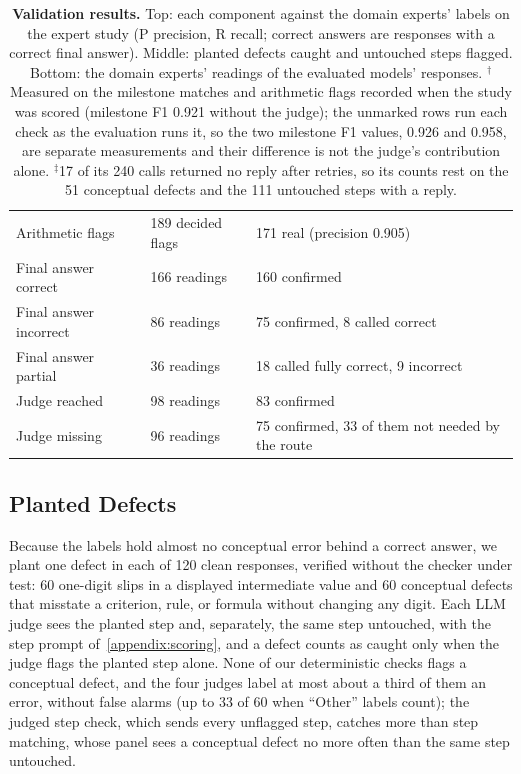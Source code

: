\begin{table}[t]
\begin{tabular}{l|l|l}
        Arithmetic flags & 189 decided flags & 171 real (precision 0.905) \\
        Final answer correct & 166 readings & 160 confirmed \\
        Final answer incorrect & 86 readings & 75 confirmed, 8 called correct \\
        Final answer partial & 36 readings & 18 called fully correct, 9 incorrect \\
        Judge reached & 98 readings & 83 confirmed \\
        Judge missing & 96 readings & 75 confirmed, 33 of them not needed by the route \\
        \bottomrule
    \end{tabular}
    \caption{\textbf{Validation results.} Top: each component against the domain experts' labels on
    the expert study (P precision, R recall; correct answers are responses with a correct final
    answer).
    Middle: planted defects caught and untouched steps flagged.
    Bottom: the domain experts' readings of the evaluated models' responses.
    $^\dagger$Measured on the milestone matches and arithmetic flags recorded when the study was
    scored (milestone F1 0.921 without the judge); the unmarked rows run each check as the
    evaluation runs it, so the two milestone F1 values, 0.926 and 0.958, are separate measurements
    and their difference is not the judge's contribution alone.
    $^\ddagger$17 of its 240 calls returned no reply after retries, so its counts rest on the 51
    conceptual defects and the 111 untouched steps with a reply.}
    \label{tab:validation_results}
\end{table}

\subsection{Planted Defects}

Because the labels hold almost no conceptual error behind a correct answer, we plant one defect in
each of 120 clean responses, verified without the checker under test: 60 one-digit slips in a
displayed intermediate value and 60 conceptual defects that misstate a criterion, rule, or formula
without changing any digit.
Each LLM judge sees the planted step and, separately, the same step untouched, with the step prompt
of~\autoref{appendix:scoring}, and a defect counts as caught only when the judge flags the planted
step alone.
None of our deterministic checks flags a conceptual defect, and the four judges label at most about
a third of them an error, without false alarms (up to 33 of 60 when ``Other'' labels count); the
judged step check, which sends every unflagged step, catches more than step matching, whose panel
sees a conceptual defect no more often than the same step untouched.

